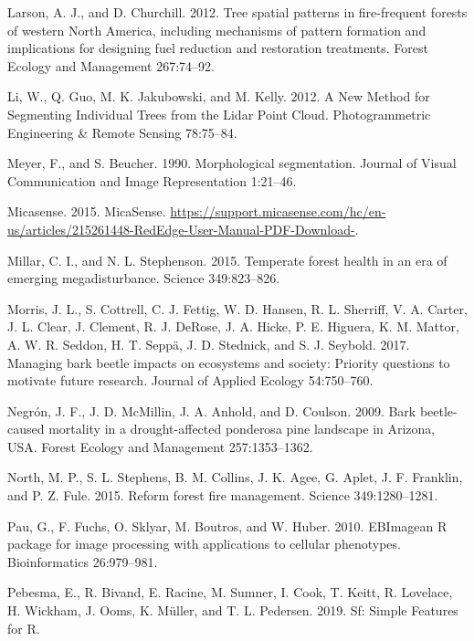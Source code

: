 \documentclass[]{article}
\begin{document}
\hypertarget{ref-larson2012}{}
Larson, A. J., and D. Churchill. 2012. Tree spatial patterns in
fire-frequent forests of western North America, including mechanisms of
pattern formation and implications for designing fuel reduction and
restoration treatments. Forest Ecology and Management 267:74--92.

\hypertarget{ref-li2012}{}
Li, W., Q. Guo, M. K. Jakubowski, and M. Kelly. 2012. A New Method for
Segmenting Individual Trees from the Lidar Point Cloud. Photogrammetric
Engineering \& Remote Sensing 78:75--84.

\hypertarget{ref-meyer1990}{}
Meyer, F., and S. Beucher. 1990. Morphological segmentation. Journal of
Visual Communication and Image Representation 1:21--46.

\hypertarget{ref-micasense2015}{}
Micasense. 2015. MicaSense.
\url{https://support.micasense.com/hc/en-us/articles/215261448-RedEdge-User-Manual-PDF-Download-}.

\hypertarget{ref-millar2015}{}
Millar, C. I., and N. L. Stephenson. 2015. Temperate forest health in an
era of emerging megadisturbance. Science 349:823--826.

\hypertarget{ref-morris2017}{}
Morris, J. L., S. Cottrell, C. J. Fettig, W. D. Hansen, R. L. Sherriff,
V. A. Carter, J. L. Clear, J. Clement, R. J. DeRose, J. A. Hicke, P. E.
Higuera, K. M. Mattor, A. W. R. Seddon, H. T. Seppä, J. D. Stednick, and
S. J. Seybold. 2017. Managing bark beetle impacts on ecosystems and
society: Priority questions to motivate future research. Journal of
Applied Ecology 54:750--760.

\hypertarget{ref-negron2009}{}
Negrón, J. F., J. D. McMillin, J. A. Anhold, and D. Coulson. 2009. Bark
beetle-caused mortality in a drought-affected ponderosa pine landscape
in Arizona, USA. Forest Ecology and Management 257:1353--1362.

\hypertarget{ref-north2015}{}
North, M. P., S. L. Stephens, B. M. Collins, J. K. Agee, G. Aplet, J. F.
Franklin, and P. Z. Fule. 2015. Reform forest fire management. Science
349:1280--1281.

\hypertarget{ref-pau2010}{}
Pau, G., F. Fuchs, O. Sklyar, M. Boutros, and W. Huber. 2010. EBImagean
R package for image processing with applications to cellular phenotypes.
Bioinformatics 26:979--981.

\hypertarget{ref-pebesma2019}{}
Pebesma, E., R. Bivand, E. Racine, M. Sumner, I. Cook, T. Keitt, R.
Lovelace, H. Wickham, J. Ooms, K. Müller, and T. L. Pedersen. 2019. Sf:
Simple Features for R.
\end{document}
